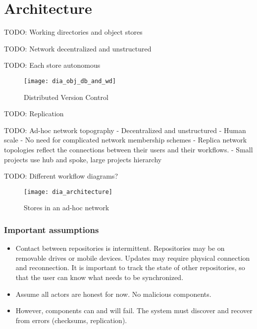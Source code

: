 \chapter{Architecture}

TODO: Working directories and object stores

TODO: Network decentralized and unstructured

TODO: Each store autonomous

\begin{figure}[h!]
  \caption{Distributed Version Control}
  \label{fig:dia_obj_db_and_wd}
  \centering
    \texttt{[image: dia\_obj\_db\_and\_wd]}
\end{figure}

TODO: Replication

TODO: Ad-hoc network topography
    - Decentralized and unstructured
    - Human scale
    - No need for complicated network membership schemes
    - Replica network topologies reflect the connections between their users and
    their workflows.
    - Small projects use hub and spoke, large projects hierarchy

TODO: Different workflow diagrams?

\begin{figure}[h]
  \caption{Stores in an ad-hoc network}
  \label{fig:dia_architecture}
  \centering
    \texttt{[image: dia\_architecture]}
\end{figure}

\subsection{Important assumptions}

\begin{itemize}

  \item Contact between repositories is intermittent. Repositories may be on
    removable drives or mobile devices. Updates may require physical connection
    and reconnection. It is important to track the state of other repositories,
    so that the user can know what needs to be synchronized.

  \item Assume all actors are honest for now. No malicious components.

  \item However, components can and will fail. The system must discover and
    recover from errors (checksums, replication).

\end{itemize}
